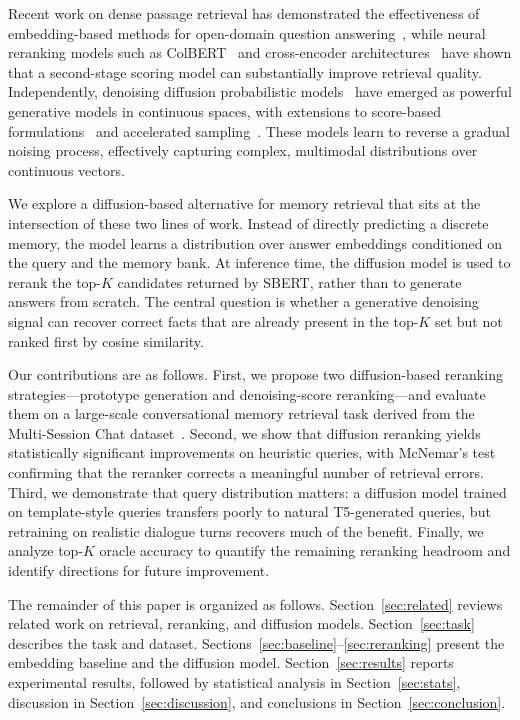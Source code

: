 \documentclass{article}
\begin{document}
Recent work on dense passage retrieval has demonstrated the effectiveness of embedding-based methods for open-domain question answering~\cite{karpukhin2020dpr}, while neural reranking models such as ColBERT~\cite{khattab2020colbert} and cross-encoder architectures~\cite{nogueira2020passage} have shown that a second-stage scoring model can substantially improve retrieval quality. Independently, denoising diffusion probabilistic models~\cite{ho2020ddpm} have emerged as powerful generative models in continuous spaces, with extensions to score-based formulations~\cite{song2021scorebased} and accelerated sampling~\cite{song2021ddim}. These models learn to reverse a gradual noising process, effectively capturing complex, multimodal distributions over continuous vectors.

We explore a diffusion-based alternative for memory retrieval that sits at the intersection of these two lines of work. Instead of directly predicting a discrete memory, the model learns a distribution over answer embeddings conditioned on the query and the memory bank. At inference time, the diffusion model is used to rerank the top-$K$ candidates returned by SBERT, rather than to generate answers from scratch. The central question is whether a generative denoising signal can recover correct facts that are already present in the top-$K$ set but not ranked first by cosine similarity.

Our contributions are as follows. First, we propose two diffusion-based reranking strategies---prototype generation and denoising-score reranking---and evaluate them on a large-scale conversational memory retrieval task derived from the Multi-Session Chat dataset~\cite{xu2022msc}. Second, we show that diffusion reranking yields statistically significant improvements on heuristic queries, with McNemar's test confirming that the reranker corrects a meaningful number of retrieval errors. Third, we demonstrate that query distribution matters: a diffusion model trained on template-style queries transfers poorly to natural T5-generated queries, but retraining on realistic dialogue turns recovers much of the benefit. Finally, we analyze top-$K$ oracle accuracy to quantify the remaining reranking headroom and identify directions for future improvement.

The remainder of this paper is organized as follows. Section~\ref{sec:related} reviews related work on retrieval, reranking, and diffusion models. Section~\ref{sec:task} describes the task and dataset. Sections~\ref{sec:baseline}--\ref{sec:reranking} present the embedding baseline and the diffusion model. Section~\ref{sec:results} reports experimental results, followed by statistical analysis in Section~\ref{sec:stats}, discussion in Section~\ref{sec:discussion}, and conclusions in Section~\ref{sec:conclusion}.
\end{document}
